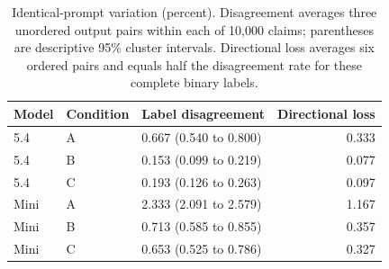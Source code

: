 \begin{table}[htbp]\centering\small
\caption{Identical-prompt variation (percent). Disagreement averages three unordered output pairs within each of 10,000 claims; parentheses are descriptive 95\% cluster intervals. Directional loss averages six ordered pairs and equals half the disagreement rate for these complete binary labels.}\label{tab:variability}
\begin{tabularx}{\linewidth}{llXr}\toprule
Model & Condition & Label disagreement & Directional loss \\\midrule
5.4 & A & 0.667 (0.540 to 0.800) & 0.333 \\
5.4 & B & 0.153 (0.099 to 0.219) & 0.077 \\
5.4 & C & 0.193 (0.126 to 0.263) & 0.097 \\
Mini & A & 2.333 (2.091 to 2.579) & 1.167 \\
Mini & B & 0.713 (0.585 to 0.855) & 0.357 \\
Mini & C & 0.653 (0.525 to 0.786) & 0.327 \\
\bottomrule
\end{tabularx}
\end{table}